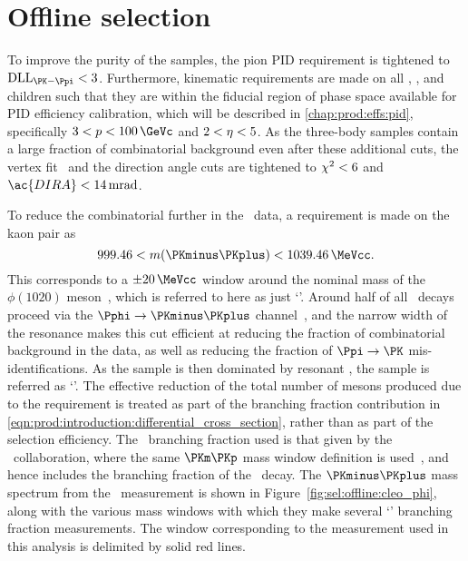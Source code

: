 \section{Offline selection}
\label{chap:prod:sel:offline}

To improve the purity of the samples, the pion \ac{PID} requirement is 
tightened to $\dllkpi < 3$.
Furthermore, kinematic requirements are made on all \PDzero, \PDplus, and 
\PDsplus children such that they are within the fiducial region of phase space 
available for \ac{PID} efficiency calibration, which will be described in 
\cref{chap:prod:effs:pid}, specifically $3 < \ptot < \SI{100}{\GeVc}$ and $2 < 
\eta < 5$.
As the three-body samples contain a large fraction of combinatorial background 
even after these additional cuts, the vertex fit \chisq\ and the direction 
angle cuts are tightened to $\chi^2 < 6$ and $\ac{DIRA} < 
\SI{14}{\milli\radian}$.

To reduce the combinatorial further in the \DspToKKpi\ data, a requirement is 
made on the kaon pair as
\begin{equation}
  999.46 < m(\PKminus\PKplus) < \SI{1039.46}{\MeVcc}.
  \label{eqn:prod:sel:phi_cut}
\end{equation}
This corresponds to a $\pm\SI{20}{\MeVcc}$ window around the nominal mass of 
the $\phi(1020)$ meson~\cite{PDG2014}, which is referred to here as just 
`\Pphi'.
Around half of all \DspToKKpi\ decays proceed via the 
$\decay{\Pphi}{\PKminus\PKplus}$ channel~\cite{PDG2014}, and the narrow width 
of the \Pphi resonance makes this cut efficient at reducing the fraction of 
combinatorial background in the data, as well as reducing the fraction of $\Ppi 
\to \PK$ mis-identifications.
As the \DspToKKpi sample is then dominated by resonant \DspTophipi, the 
\PDsplus sample is referred as `\DspTophipi'.
The effective reduction of the total number of \PDsplus mesons produced due to 
the \Pphi requirement is treated as part of the branching fraction contribution 
in \cref{eqn:prod:introduction:differential_cross_section}, rather than as part 
of the selection efficiency.
The \DspTophipi\ branching fraction used is that given by the \cleo\ 
collaboration, where the same $\PKm\PKp$ mass window definition is 
used~\cite{Alexander:2008aa}, and hence includes the branching fraction of the 
\phiToKK\ decay.
The $\PKminus\PKplus$ mass spectrum from the \cleo\ measurement is shown in 
Figure~\ref{fig:sel:offline:cleo_phi}, along with the various mass windows with 
which they make several `\DspTophipi' branching fraction measurements.
The window corresponding to the measurement used in this analysis is delimited 
by solid red lines.

